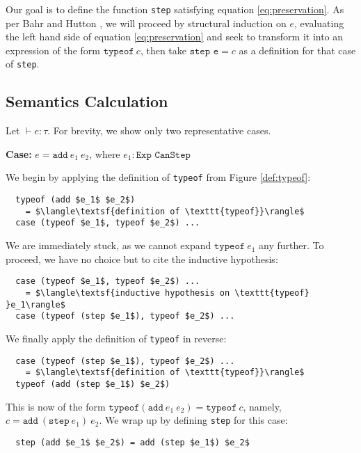 \documentclass[manuscript,screen,sigplan]{acmart}
\begin{document}
Our goal is to define the function \texttt{step}
satisfying equation \ref{eq:preservation}. As per Bahr and Hutton
\cite{bahr:2015}, we will proceed by structural induction on $e$, evaluating
the left hand side of equation \ref{eq:preservation} and seek to transform it
into an expression of the form $\texttt{typeof}\ c$, then take $\texttt{step e}
= c$ as a definition for that case of \texttt{step}.

\subsection{Semantics Calculation}

Let $\vdash e : \tau$. For brevity, we show only two representative cases.

\hfill

\textbf{Case:} $e = \texttt{add}\ e_1\ e_2$, where $e_1 : \texttt{Exp CanStep}$

\hfill

We begin by applying the definition of \texttt{typeof} from Figure \ref{def:typeof}:

\begin{lstlisting}
  typeof (add $e_1$ $e_2$)
    = $\langle\textsf{definition of \texttt{typeof}}\rangle$
  case (typeof $e_1$, typeof $e_2$) ...
\end{lstlisting}

We are immediately stuck, as we cannot expand $\texttt{typeof}\ e_1$ any
further. To proceed, we have no choice but to cite the inductive hypothesis:

\begin{lstlisting}
  case (typeof $e_1$, typeof $e_2$) ...
    = $\langle\textsf{inductive hypothesis on \texttt{typeof} }e_1\rangle$
  case (typeof (step $e_1$), typeof $e_2$) ...
\end{lstlisting}

We finally apply the definition of \texttt{typeof} in reverse:

\begin{lstlisting}
  case (typeof (step $e_1$), typeof $e_2$) ...
    = $\langle\textsf{definition of \texttt{typeof}}\rangle$
  typeof (add (step $e_1$) $e_2$)
\end{lstlisting}

This is now of the form $\texttt{typeof} (\texttt{add}\ e_1\ e_2) = \texttt{typeof}\ c$,
namely, $c = \texttt{add}\ (\texttt{step}\ e_1)\ e_2$. We wrap up by defining
\texttt{step} for this case:

\begin{lstlisting}
  step (add $e_1$ $e_2$) = add (step $e_1$) $e_2$
\end{lstlisting}
\end{document}
